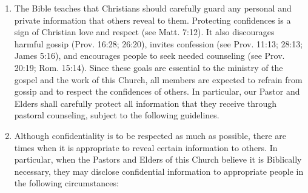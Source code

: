 \documentclass[
]{book}
\begin{document}
\begin{enumerate}
\def\labelenumi{\alph{enumi}.}
\item
  The Bible teaches that Christians should carefully guard any personal and private information that others reveal to them. Protecting confidences is a sign of Christian love and respect (see Matt. 7:12). It also discourages harmful gossip (Prov. 16:28; 26:20), invites confes­sion (see Prov. 11:13; 28:13; James 5:16), and encourages people to seek needed counseling (see Prov. 20:19; Rom. 15:14). Since these goals are essential to the ministry of the gospel and the work of this Church, all members are expected to refrain from gossip and to respect the confi­dences of others. In particular, our Pastor and Elders shall carefully protect all information that they receive through pastoral counseling, subject to the following guidelines.
\item
  Although confidentiality is to be respected as much as possible, there are times when it is appropriate to reveal certain information to others. In particular, when the Pastors and Elders of this Church believe it is Biblically necessary, they may disclose confidential information to appropriate people in the following circumstances:


\end{enumerate}
\end{document}
